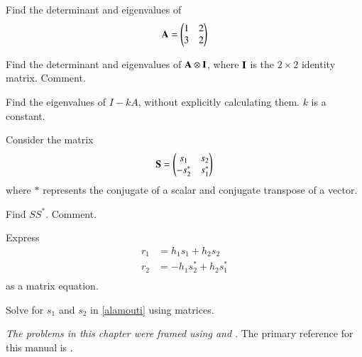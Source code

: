 \begin{problem}
Find the determinant and eigenvalues of 
%
\begin{equation}
\mathbf{A}=\begin{pmatrix}
1 & 2 \\
3 & 2
\end{pmatrix}
\end{equation}
%
\end{problem}
\begin{problem}
Find the determinant and eigenvalues of $\mathbf{A} \otimes \mathbf{I}$, where $\mathbf{I}$ is the $2\times 2$ identity matrix.  Comment.
%
\end{problem}
\begin{problem}
Find the eigenvalues of $I-kA$, without explicitly calculating them. $k$ is a constant.
\end{problem}
Consider the matrix
%
\begin{equation}
\mbf{S} = 
\begin{pmatrix}
s_1 & s_2 \\
-s_2^{*} & s_1^{*}
\end{pmatrix}
%
\end{equation} 
%
where $*$ represents the conjugate of a scalar and conjugate transpose of a vector.
\begin{problem}
Find $SS^{*}$.  Comment.
\end{problem}
\begin{problem}
Express
%
\begin{equation}
\label{alamouti}
\begin{split}
r_1 &= h_1s_1+h_2s_2 \\
r_2 &= -h_1s_2^{*}+h_2s_1^{*} \\
\end{split}
\end{equation}
%
as a matrix equation.
\end{problem}
\begin{problem}
Solve for  $s_1$ and $s_2$ in \eqref{alamouti} using matrices.
\end{problem}

{\em The problems in this chapter were framed using \cite{parul} and \cite{alamouti}}.  The primary reference for this manual is \cite{davidlay}.





%




